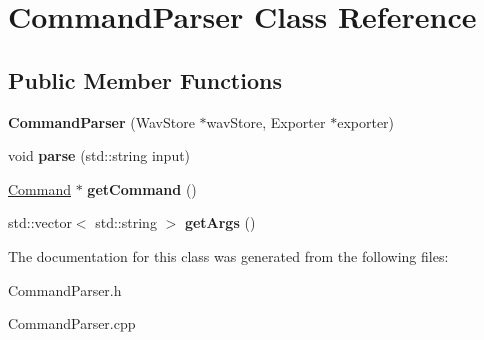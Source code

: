 \hypertarget{classCommandParser}{}\section{Command\+Parser Class Reference}
\label{classCommandParser}
\subsection*{Public Member Functions}
\begin{DoxyCompactItemize}
\item 
\mbox{\label{classCommandParser_a9146c54706cabfb837ba34709b2db02c}} 
{\bfseries Command\+Parser} (Wav\+Store $\ast$wav\+Store, Exporter $\ast$exporter)
\item 
\mbox{\label{classCommandParser_a803c2a599cae6e722c198e6ba3dc9caf}} 
void {\bfseries parse} (std\+::string input)
\item 
\mbox{\label{classCommandParser_ab5697cd3e81c17b9963e21a6c135341f}} 
\hyperlink{classCommand}{Command} $\ast$ {\bfseries get\+Command} ()
\item 
\mbox{\label{classCommandParser_ab669ec9934f3c7f0490b3fed5b70e56c}} 
std\+::vector$<$ std\+::string $>$ {\bfseries get\+Args} ()
\end{DoxyCompactItemize}


The documentation for this class was generated from the following files\+:\begin{DoxyCompactItemize}
\item 
Command\+Parser.\+h\item 
Command\+Parser.\+cpp\end{DoxyCompactItemize}
